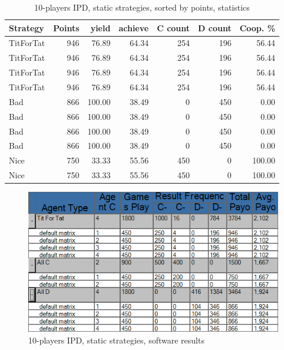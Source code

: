 \documentclass[journal,10pt,twoside]{IEEEtran}
\begin{document}
\begin{table}[ht]
    \caption{10-players IPD, static strategies, sorted by points, statistics}
    \label{tab:ipdmp10stat}
    \centering
    \begin{tabular}{l|rrr|rrr} \toprule
        Strategy  & Points &  yield & achieve & C count & D count & Coop. \% \\ \midrule
        TitForTat &    946 &  76.89 &   64.34 &     254 &     196 &    56.44 \\
        TitForTat &    946 &  76.89 &   64.34 &     254 &     196 &    56.44 \\
        TitForTat &    946 &  76.89 &   64.34 &     254 &     196 &    56.44 \\
        TitForTat &    946 &  76.89 &   64.34 &     254 &     196 &    56.44 \\
        Bad       &    866 & 100.00 &   38.49 &       0 &     450 &     0.00 \\
        Bad       &    866 & 100.00 &   38.49 &       0 &     450 &     0.00 \\
        Bad       &    866 & 100.00 &   38.49 &       0 &     450 &     0.00 \\
        Bad       &    866 & 100.00 &   38.49 &       0 &     450 &     0.00 \\
        Nice      &    750 &  33.33 &   55.56 &     450 &       0 &   100.00 \\
        Nice      &    750 &  33.33 &   55.56 &     450 &       0 &   100.00 \\ \bottomrule
    \end{tabular}
\end{table}

\begin{figure}[!ht]
    \centering
    \includegraphics[width=.6\columnwidth]{../img/ipdmp/ipdmp10-table-det}
    \caption{10-players IPD, static strategies, software results \cite{demosw}}
    \label{fig:ipdmp10statsw}
\end{figure}
\end{document}
